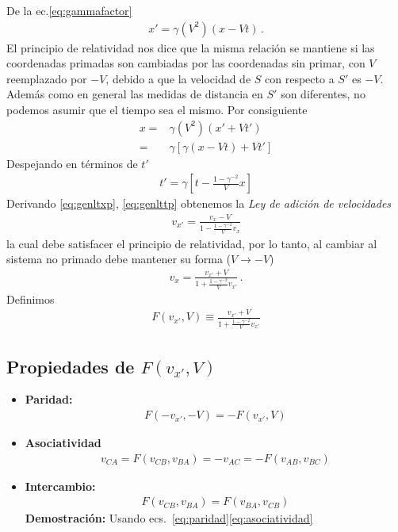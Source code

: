 De la ec.\eqref{eq:gammafactor}
\begin{align}
\label{eq:genltxp}
  x'=\gamma(V^2)(x-V t)\,.
\end{align}
El principio de relatividad nos dice que la misma relación se mantiene si las coordenadas primadas son cambiadas por las coordenadas sin primar, con $V$ reemplazado por $-V$, debido a que la velocidad de $S$ con respecto a $S'$ es $-V$. Además como en general las medidas de distancia en $S'$ son diferentes, no podemos asumir que el tiempo sea el mismo. Por consiguiente
\begin{align*}
    x=&\gamma(V^2)(x'+V t')\nonumber\\
    =&\gamma\left[\gamma(x-V t)+V t'\right]
\end{align*}
Despejando en términos de $t'$ %
\begin{align}
  \label{eq:genlttp}
  t'=\gamma\left[t-\frac{1-\gamma^{-2}}{V}x\right]
\end{align}
Derivando \eqref{eq:genltxp}, \eqref{eq:genlttp} obtenemos la \emph{Ley de adición de velocidades} %
\begin{align*}
  v_{x'}=\frac{v_x-V}{1-\frac{1-\gamma^{-2}}{V}v_x}
\end{align*}
la cual debe satisfacer el principio de relatividad, por lo tanto, al cambiar al sistema no primado debe mantener su forma ($V\to -V$)
\begin{align}
  \label{eq:adicionvel}
  v_{x}=\frac{v_{x'}+V}{1+\frac{1-\gamma^{-2}}{V}v_{x'}}\,.
\end{align}
Definimos
\begin{align*}
  F(v_{x'},V)\equiv\frac{v_{x'}+V}{1+\frac{1-\gamma^{-2}}{V}v_{x'}}
\end{align*}

\subsection{Propiedades de $F(v_{x'},V)$}
\begin{itemize}
\item \textbf{Paridad:}
  \begin{align}
    \label{eq:paridad}
    F(-v_{x'},-V)=-F(v_{x'},V)
  \end{align}
\item \textbf{Asociatividad}
  \begin{align}
    \label{eq:asociatividad}
    v_{CA}=F(v_{CB},v_{BA})=-v_{AC}=-F(v_{AB},v_{BC})
  \end{align}
\item \textbf{Intercambio:}
  \begin{align}
    \label{eq:intercambio}
    F(v_{CB},v_{BA})=F(v_{BA},v_{CB})
  \end{align}
\textbf{Demostración:} Usando ecs.~\eqref{eq:paridad}\eqref{eq:asociatividad}

\end{itemize}

